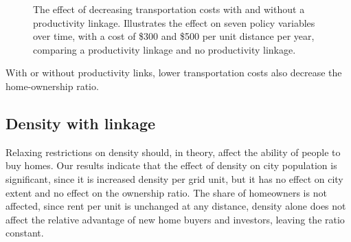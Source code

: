 \begin{figure}[h!tb]
     \caption[The effect of decreasing transportation costs with and without a productivity linkage]{The effect of decreasing transportation costs with and without a productivity linkage. Illustrates the effect on seven policy variables over time, with a cost of \$300 and \$500  per unit distance per year, comparing a productivity linkage and no productivity linkage.}
    \label{fig:Productivity_link_W-WO-transportation-cost}
\end{figure}



With or without productivity links, lower transportation costs also decrease the home-ownership ratio. %




\newpage


\subsection{Density with linkage}
Relaxing restrictions on density should, in theory, affect the ability of people to buy homes. Our results indicate that the effect of density on city population is significant, since it is increased density per grid unit, but it has no effect on city extent and no effect on the ownership ratio. %
The share of homeowners is not affected, since rent per unit is unchanged at any distance, density alone does not affect the relative advantage of new home buyers and investors, leaving the ratio constant. %

